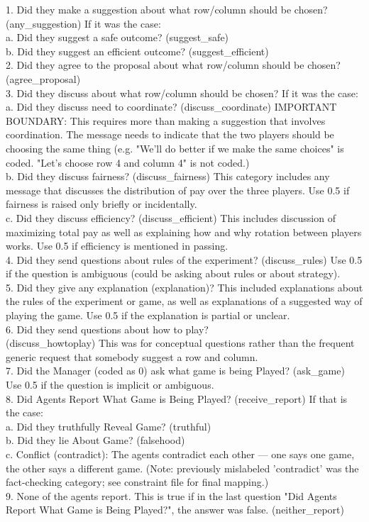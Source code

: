 \documentclass[11pt]{article}
\begin{document}
\begin{sloppypar}
\begin{appendices}
\begin{tcolorbox}
1.	Did they make a suggestion about what row/column should be chosen? (any\_suggestion) If it was the case:\\
a.	Did they suggest a safe outcome? (suggest\_safe)\\
b.	Did they suggest an efficient outcome? (suggest\_efficient)\\

2.	Did they agree to the proposal about what row/column should be chosen? (agree\_proposal)\\
3.	Did they discuss about what row/column should be chosen? If it was the case:\\
a.	Did they discuss need to coordinate? (discuss\_coordinate) IMPORTANT BOUNDARY: This requires more than making a suggestion that involves coordination. The message needs to indicate that the two players should be choosing the same thing (e.g. "We'll do better if we make the same choices" is coded. "Let's choose row 4 and column 4" is not coded.)	\\
b.	Did they discuss fairness? (discuss\_fairness) This category includes any message that discusses the distribution of pay over the three players. Use 0.5 if fairness is raised only briefly or incidentally.\\		
c.	Did they discuss efficiency? (discuss\_efficient) This includes discussion of maximizing total pay as well as explaining how and why rotation between players works. Use 0.5 if efficiency is mentioned in passing.\\
4.	Did they send questions about rules of the experiment? (discuss\_rules) Use 0.5 if the question is ambiguous (could be asking about rules or about strategy).\\
5.	Did they give any explanation (explanation)? This included explanations about the rules of the experiment or game, as well as explanations of a suggested way of playing the game. Use 0.5 if the explanation is partial or unclear.\\
6.	Did they send questions about how to play?\\(discuss\_howtoplay) This was for conceptual questions rather than the frequent generic request that somebody suggest a row and column.\\
7.	Did the Manager (coded as 0) ask what game is being Played? (ask\_game) Use 0.5 if the question is implicit or ambiguous.\\
8.	Did Agents Report What Game is Being Played? (receive\_report) If that is the case:\\
a.	Did they truthfully Reveal Game? (truthful)\\
b.	Did they lie About Game? (falsehood)\\
c.	Conflict (contradict): The agents contradict each other — one says one game, the other says a different game. (Note: previously mislabeled 'contradict' was the fact-checking category; see constraint file for final mapping.)\\
9.	None of the agents report. This is true if in the last question "Did Agents Report What Game is Being Played?", the answer was false. (neither\_report)\\


\end{tcolorbox}
\end{appendices}
\end{sloppypar}
\end{document}
